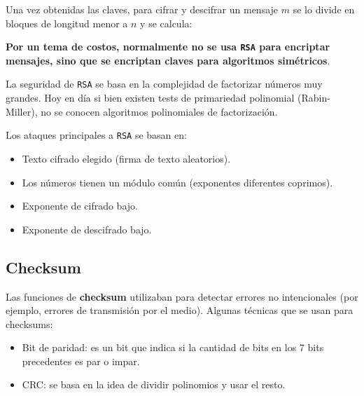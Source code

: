 Una vez obtenidas las claves, para cifrar y descifrar un mensaje $m$ se lo divide en bloques de longitud menor a $n$ y se calcula:


\textbf{Por un tema de costos, normalmente no se usa \texttt{RSA} para encriptar mensajes, sino que se encriptan claves para algoritmos simétricos}.

La seguridad de \texttt{RSA} se basa en la complejidad de factorizar números muy grandes. Hoy en día si bien existen tests de primariedad polinomial (Rabin-Miller), no se conocen algoritmos polinomiales de factorización. 

Los ataques principales a \texttt{RSA} se basan en:
\begin{itemize}
	\item Texto cifrado elegido (firma de texto aleatorios).
	\item Los números tienen un módulo común (exponentes diferentes coprimos).
	\item Exponente de cifrado bajo.
	\item Exponente de descifrado bajo.
\end{itemize}



\subsection{Checksum}
Las funciones de \textbf{checksum} utilizaban para detectar errores no intencionales (por ejemplo, errores de transmisión por el medio). Algunas técnicas que se usan para checksums:
\begin{itemize}
	\item Bit de paridad: es un bit que indica si la cantidad de bits en los 7 bits precedentes es par o impar.
	\item CRC: se basa en la idea de dividir polinomios y usar el resto.
\end{itemize}

